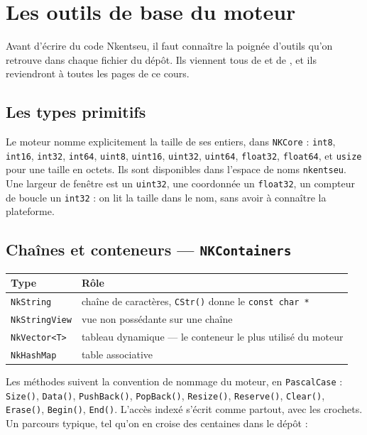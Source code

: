 \section{Les outils de base du moteur}

Avant d'écrire du code Nkentseu, il faut connaître la poignée d'outils
qu'on retrouve dans chaque fichier du dépôt. Ils viennent tous de
 et de , et ils reviendront à
toutes les pages de ce cours.

\subsection{Les types primitifs}

Le moteur nomme explicitement la taille de ses entiers, dans
\texttt{NKCore} : \texttt{int8}, \texttt{int16}, \texttt{int32},
\texttt{int64}, \texttt{uint8}, \texttt{uint16}, \texttt{uint32},
\texttt{uint64}, \texttt{float32}, \texttt{float64}, et \texttt{usize} pour une
taille en octets. Ils sont disponibles dans l'espace de noms
\texttt{nkentseu}. Une largeur de fenêtre est un \texttt{uint32}, une
coordonnée un \texttt{float32}, un compteur de boucle un \texttt{int32} : on
lit la taille dans le nom, sans avoir à connaître la plateforme.

\subsection{Chaînes et conteneurs — \texttt{NKContainers}}

\begin{center}
\begin{tabular}{@{}ll@{}}
\toprule
\textbf{Type} & \textbf{Rôle} \\
\midrule
\texttt{NkString}     & chaîne de caractères, \texttt{CStr()} donne le \texttt{const char *} \\
\texttt{NkStringView} & vue non possédante sur une chaîne \\
\texttt{NkVector<T>}  & tableau dynamique — le conteneur le plus utilisé du moteur \\
\texttt{NkHashMap}    & table associative \\
\bottomrule
\end{tabular}
\end{center}

Les méthodes suivent la convention de nommage du moteur, en
\texttt{PascalCase} : \texttt{Size()}, \texttt{Data()}, \texttt{PushBack()},
\texttt{PopBack()}, \texttt{Resize()}, \texttt{Reserve()}, \texttt{Clear()},
\texttt{Erase()}, \texttt{Begin()}, \texttt{End()}. L'accès indexé s'écrit
comme partout, avec les crochets. Un parcours typique, tel qu'on en croise des
centaines dans le dépôt :

